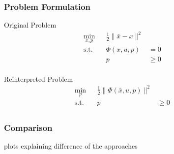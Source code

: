\begin{frame}
    \frametitle{Problem Formulation}

    Original Problem
    \begin{align*}
        \min_{x,p} & & \frac{1}{2} \| \bar{x} - x \|^2 & & \\
        \operatorname{s.t.} & & \Phi(x,u,p) & = 0 & & \\
                            & & p & \geq 0 & & \\
    \end{align*}

    Reinterpreted Problem
    \begin{align*}
        \min_{p}  & & \frac{1}{2} \| \Phi(\bar{x},u,p) \|^2 & & \\
        \operatorname{s.t.} & & p & \geq 0 & & \\
    \end{align*}
\end{frame}

\begin{frame}
    \frametitle{Comparison}

    plots explaining difference of the approaches
\end{frame}


